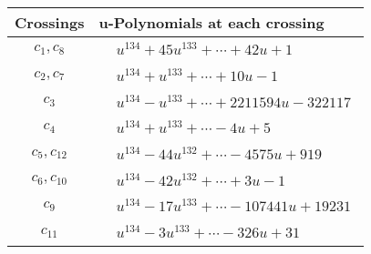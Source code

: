 \documentclass[1p]{elsarticle_modified}
\theoremstyle{definition}
\begin{document}
\begin{tabular}{m{50pt}|m{274pt}}
Crossings & \hspace{64pt}u-Polynomials at each crossing \\
\hline $$\begin{aligned}c_{1},c_{8}\end{aligned}$$&$\begin{aligned}
&u^{134}+45 u^{133}+\cdots+42 u+1
\end{aligned}$\\
\hline $$\begin{aligned}c_{2},c_{7}\end{aligned}$$&$\begin{aligned}
&u^{134}+u^{133}+\cdots+10 u-1
\end{aligned}$\\
\hline $$\begin{aligned}c_{3}\end{aligned}$$&$\begin{aligned}
&u^{134}- u^{133}+\cdots+2211594 u-322117
\end{aligned}$\\
\hline $$\begin{aligned}c_{4}\end{aligned}$$&$\begin{aligned}
&u^{134}+u^{133}+\cdots-4 u+5
\end{aligned}$\\
\hline $$\begin{aligned}c_{5},c_{12}\end{aligned}$$&$\begin{aligned}
&u^{134}-44 u^{132}+\cdots-4575 u+919
\end{aligned}$\\
\hline $$\begin{aligned}c_{6},c_{10}\end{aligned}$$&$\begin{aligned}
&u^{134}-42 u^{132}+\cdots+3 u-1
\end{aligned}$\\
\hline $$\begin{aligned}c_{9}\end{aligned}$$&$\begin{aligned}
&u^{134}-17 u^{133}+\cdots-107441 u+19231
\end{aligned}$\\
\hline $$\begin{aligned}c_{11}\end{aligned}$$&$\begin{aligned}
&u^{134}-3 u^{133}+\cdots-326 u+31
\end{aligned}$\\
\hline
\end{tabular}\\~\\
\end{document}
